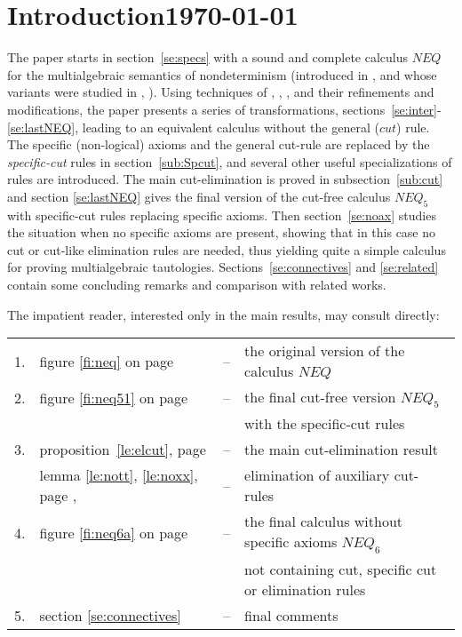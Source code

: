 
\section{Introduction\hfill{\small\today}}
The paper starts in section~\ref{se:specs} with a sound and complete calculus 
$NEQ$ for the
multialgebraic semantics of nondeterminism (introduced in \cite{Mich}, and whose 
variants were studied in 
\cite{WM}, \cite{Top}). Using techniques of \cite{K}, \cite{Aida1}, \cite{Aida2},
and their refinements and modifications, the paper presents a series
of transformations, sections~\ref{se:inter}-\ref{se:lastNEQ}, leading
to an equivalent calculus without the general ($cut$) rule. The
specific (non-logical) axioms and the general cut-rule are replaced by 
the {\em specific-cut}
rules in section~\ref{sub:Spcut}, and several other useful specializations of rules are
introduced. The main cut-elimination is proved in subsection~\ref{sub:cut} and section
\ref{se:lastNEQ} gives the final version of the cut-free calculus $NEQ_5$ with
specific-cut rules replacing specific axioms.
Then section~\ref{se:noax} studies the situation when no specific
axioms are present, showing that in this case no cut or cut-like elimination rules 
are needed,
thus yielding quite a simple calculus for proving multialgebraic tautologies.
Sections~\ref{se:connectives} and \ref{se:related} contain some concluding remarks and
comparison with related works.

The impatient reader, interested only in the main results, may consult directly:\\[1ex]
\begin{tabular}{rlcl}
1. &  figure \ref{fi:neq} on page \pageref{fi:neq} & -- & the original version of
the calculus $NEQ$ \\
2. & figure \ref{fi:neq51} on page \pageref{fi:neq51} & -- & the final cut-free
version $NEQ_5$ \\
 & & & with the specific-cut rules \\
3. & proposition~\ref{le:elcut}, page \pageref{le:elcut} 
       & -- & the main cut-elimination result \\
   & lemma \ref{le:nott}, \ref{le:noxx}, page \pageref{le:nott}, \pageref{le:noxx} 
       & -- & elimination of auxiliary cut-rules \\
4. & figure \ref{fi:neq6a} on page \pageref{fi:neq6a} & -- & the final calculus
without specific axioms $NEQ_6$ \\ 
 & & & not containing cut, specific cut or elimination rules \\
5. & section \ref{se:connectives} & -- & final comments
\end{tabular}

